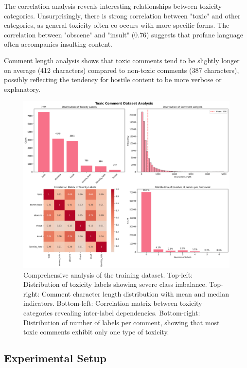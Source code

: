 \documentclass[11pt]{article}
\begin{document}
The correlation analysis reveals interesting relationships between toxicity categories. Unsurprisingly, there is strong correlation between "toxic" and other categories, as general toxicity often co-occurs with more specific forms. The correlation between "obscene" and "insult" (0.76) suggests that profane language often accompanies insulting content.

Comment length analysis shows that toxic comments tend to be slightly longer on average (412 characters) compared to non-toxic comments (387 characters), possibly reflecting the tendency for hostile content to be more verbose or explanatory.

\begin{figure}[ht]
    \centering
    \includegraphics[width=\textwidth]{dataset_analysis.png}
    \caption{Comprehensive analysis of the training dataset. Top-left: Distribution of toxicity labels showing severe class imbalance. Top-right: Comment character length distribution with mean and median indicators. Bottom-left: Correlation matrix between toxicity categories revealing inter-label dependencies. Bottom-right: Distribution of number of labels per comment, showing that most toxic comments exhibit only one type of toxicity.}
    \label{fig:data_analysis}
\end{figure}

\subsection{Experimental Setup}
\end{document}
